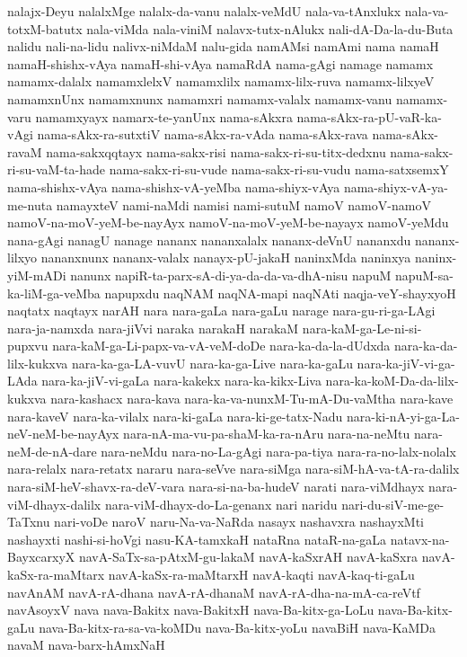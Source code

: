 {nalajx-Deyu
nalalxMge
nalalx-da-vanu
nalalx-veMdU
nala-va-tAnxlukx
nala-va-totxM-batutx
nala-viMda
nala-viniM
nalavx-tutx-nAlukx
nali-dA-Da-la-du-Buta
nalidu
nali-na-lidu
nalivx-niMdaM
nalu-gida
namAMsi
namAmi
nama
namaH
namaH-shishx-vAya
namaH-shi-vAya
namaRdA
nama-gAgi
namage
namamx
namamx-dalalx
namamxlelxV
namamxlilx
namamx-lilx-ruva
namamx-lilxyeV
namamxnUnx
namamxnunx
namamxri
namamx-valalx
namamx-vanu
namamx-varu
namamxyayx
namarx-te-yanUnx
nama-sAkxra
nama-sAkx-ra-pU-vaR-ka-vAgi
nama-sAkx-ra-sutxtiV
nama-sAkx-ra-vAda
nama-sAkx-rava
nama-sAkx-ravaM
nama-sakxqqtayx
nama-sakx-risi
nama-sakx-ri-su-titx-dedxnu
nama-sakx-ri-su-vaM-ta-hade
nama-sakx-ri-su-vude
nama-sakx-ri-su-vudu
nama-satxsemxY
nama-shishx-vAya
nama-shishx-vA-yeMba
nama-shiyx-vAya
nama-shiyx-vA-ya-me-nuta
namayxteV
nami-naMdi
namisi
nami-sutuM
namoV
namoV-namoV
namoV-na-moV-yeM-be-nayAyx
namoV-na-moV-yeM-be-nayayx
namoV-yeMdu
nana-gAgi
nanagU
nanage
nananx
nananxalalx
nananx-deVnU
nananxdu
nananx-lilxyo
nananxnunx
nananx-valalx
nanayx-pU-jakaH
naninxMda
naninxya
naninx-yiM-mADi
nanunx
napiR-ta-parx-sA-di-ya-da-da-va-dhA-nisu
napuM
napuM-sa-ka-liM-ga-veMba
napupxdu
naqNAM
naqNA-mapi
naqNAti
naqja-veY-shayxyoH
naqtatx
naqtayx
narAH
nara
nara-gaLa
nara-gaLu
narage
nara-gu-ri-ga-LAgi
nara-ja-namxda
nara-jiVvi
naraka
narakaH
narakaM
nara-kaM-ga-Le-ni-si-pupxvu
nara-kaM-ga-Li-papx-va-vA-veM-doDe
nara-ka-da-la-dUdxda
nara-ka-da-lilx-kukxva
nara-ka-ga-LA-vuvU
nara-ka-ga-Live
nara-ka-gaLu
nara-ka-jiV-vi-ga-LAda
nara-ka-jiV-vi-gaLa
nara-kakekx
nara-ka-kikx-Liva
nara-ka-koM-Da-da-lilx-kukxva
nara-kashacx
nara-kava
nara-ka-va-nunxM-Tu-mA-Du-vaMtha
nara-kave
nara-kaveV
nara-ka-vilalx
nara-ki-gaLa
nara-ki-ge-tatx-Nadu
nara-ki-nA-yi-ga-La-neV-neM-be-nayAyx
nara-nA-ma-vu-pa-shaM-ka-ra-nAru
nara-na-neMtu
nara-neM-de-nA-dare
nara-neMdu
nara-no-La-gAgi
nara-pa-tiya
nara-ra-no-lalx-nolalx
nara-relalx
nara-retatx
nararu
nara-seVve
nara-siMga
nara-siM-hA-va-tA-ra-dalilx
nara-siM-heV-shavx-ra-deV-vara
nara-si-na-ba-hudeV
narati
nara-viMdhayx
nara-viM-dhayx-dalilx
nara-viM-dhayx-do-La-genanx
nari
naridu
nari-du-siV-me-ge-TaTxnu
nari-voDe
naroV
naru-Na-va-NaRda
nasayx
nashavxra
nashayxMti
nashayxti
nashi-si-hoVgi
nasu-KA-tamxkaH
nataRna
nataR-na-gaLa
natavx-na-BayxcarxyX
navA-SaTx-sa-pAtxM-gu-lakaM
navA-kaSxrAH
navA-kaSxra
navA-kaSx-ra-maMtarx
navA-kaSx-ra-maMtarxH
navA-kaqti
navA-kaq-ti-gaLu
navAnAM
navA-rA-dhana
navA-rA-dhanaM
navA-rA-dha-na-mA-ca-reVtf
navAsoyxV
nava
nava-Bakitx
nava-BakitxH
nava-Ba-kitx-ga-LoLu
nava-Ba-kitx-gaLu
nava-Ba-kitx-ra-sa-va-koMDu
nava-Ba-kitx-yoLu
navaBiH
nava-KaMDa
navaM
nava-barx-hAmxNaH
}
